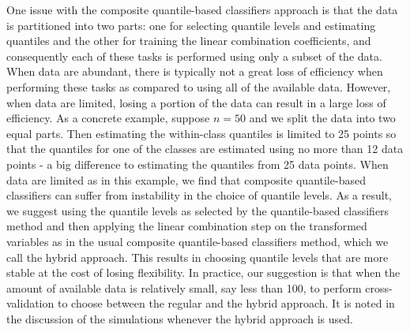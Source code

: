 One issue with the composite quantile-based classifiers approach is that the
data is partitioned into two parts: one for selecting quantile levels and
estimating quantiles and the other for training the linear combination
coefficients, and consequently each of these tasks is performed using only a
subset of the data.  When data are abundant, there is typically not a great loss
of efficiency when performing these tasks as compared to using all of the
available data.  However, when data are limited, losing a portion of the data
can result in a large loss of efficiency.  As a concrete example, suppose
$n = 50$ and we split the data into two equal parts.  Then estimating the
within-class quantiles is limited to 25 points so that the quantiles for one of
the classes are estimated using no more than 12 data points - a big difference
to estimating the quantiles from 25 data points.  When data are limited as in
this example, we find that composite quantile-based classifiers can suffer from
instability in the choice of quantile levels.  As a result, we suggest using the
quantile levels as selected by the quantile-based classifiers method and then
applying the linear combination step on the transformed variables as in the
usual composite quantile-based classifiers method, which we call the hybrid
approach.  This results in choosing quantile levels that are more stable at the
cost of losing flexibility.  In practice, our suggestion is that when the amount
of available data is relatively small, say less than 100, to perform
cross-validation to choose between the regular and the hybrid approach.  It is
noted in the discussion of the simulations whenever the hybrid approach is used.





